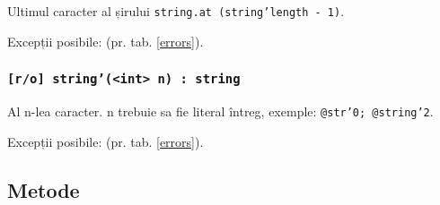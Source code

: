 Ultimul caracter al șirului \texttt{string.at (string'length - 1)}.

Excepții posibile:  (pr. tab. \ref{errors}).

\subsubsection{\texttt{[r/o] string'(<int> n) : string}}

Al n-lea caracter. n trebuie sa fie literal întreg, exemple: \texttt{@str'0; @string'2}.

Excepții posibile:  (pr. tab. \ref{errors}).

\subsection{Metode}

